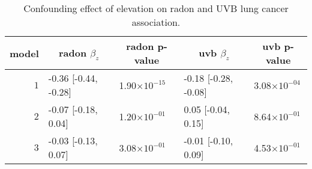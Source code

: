 %
\begin{table}[!tbp]
\caption{Confounding effect of elevation on radon and UVB lung cancer association.\label{tab:confounding}} 
\begin{center}
\begin{tabular}{rllll}
\hline\hline
\multicolumn{1}{c}{model}&\multicolumn{1}{c}{radon $\beta_z$}&\multicolumn{1}{c}{radon p-value}&\multicolumn{1}{c}{uvb $\beta_z$}&\multicolumn{1}{c}{uvb p-value}\tabularnewline
\hline
$1$&-0.36 [-0.44, -0.28]&1.90$\times10^{-15}$&-0.18 [-0.28, -0.08]&3.08$\times10^{-04}$\tabularnewline
$2$&-0.07 [-0.18, 0.04]&1.20$\times10^{-01}$&0.05 [-0.04, 0.15]&8.64$\times10^{-01}$\tabularnewline
$3$&-0.03 [-0.13, 0.07]&3.08$\times10^{-01}$&-0.01 [-0.10, 0.09]&4.53$\times10^{-01}$\tabularnewline
\hline
\end{tabular}
\end{center}
\end{table}

